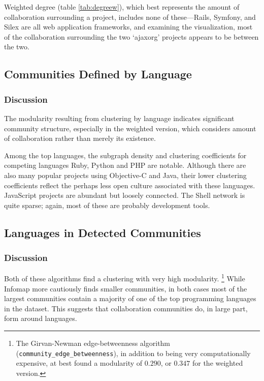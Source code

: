 \documentclass[11pt]{article}
\begin{document}
Weighted degree (table \ref{tab:degreew}), which best represents the amount of
collaboration surrounding a project, includes none of these---Rails, Symfony,
and Silex are all web application frameworks, and examining the visualization,
most of the collaboration surrounding the two `ajaxorg' projects appears to be
between the two.

\subsection{Communities Defined by Language}



\subsubsection{Discussion}
The modularity resulting from clustering by language indicates significant
community structure, especially in the weighted version, which considers amount
of collaboration rather than merely its existence.

Among the top languages, the subgraph density and clustering coefficients for
competing languages Ruby, Python and PHP are notable. Although there are also
many popular projects using Objective-C and Java, their lower clustering
coefficients reflect the perhaps less open culture associated with these
languages. JavaScript projects are abundant but loosely connected. The Shell
network is quite sparse; again, most of these are probably development tools. 

\subsection{Languages in Detected Communities}



\subsubsection{Discussion}
Both of these algorithms find a clustering with very high modularity.
\footnote{The Girvan-Newman edge-betweenness algorithm
(\texttt{community\_edge\_betweenness}), in addition to being very
computationally expensive, at best found a modularity of $0.290$, or $0.347$ for
the weighted version.} While Infomap more cautiously finds smaller communities,
in both cases most of the largest communities contain a majority of one of the
top programming languages in the dataset. This suggests that collaboration
communities do, in large part, form around languages.
\end{document}
